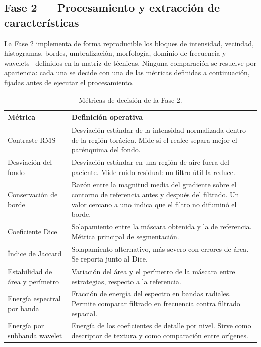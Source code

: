 \documentclass[12pt,a4paper]{article}
\begin{document}
\subsection{Fase 2 — Procesamiento y extracción de características}

La Fase 2 implementa de forma reproducible los bloques de intensidad, vecindad,
histogramas, bordes, umbralización, morfología, dominio de frecuencia y wavelets~\cite{dougherty2009}
definidos en la matriz de técnicas. Ninguna comparación se resuelve por apariencia:
cada una se decide con una de las métricas definidas a continuación, fijadas antes
de ejecutar el procesamiento.

\begin{table}[H]
\centering
\caption{Métricas de decisión de la Fase 2.}
\small
\begin{tabular}{@{}p{3.6cm}p{10.0cm}@{}}
\toprule
\textbf{Métrica} & \textbf{Definición operativa} \\
\midrule
Contraste RMS & Desviación estándar de la intensidad normalizada dentro de la región torácica. Mide si el realce separa mejor el parénquima del fondo. \\
\addlinespace
Desviación del fondo & Desviación estándar en una región de aire fuera del paciente. Mide ruido residual: un filtro útil la reduce. \\
\addlinespace
Conservación de borde & Razón entre la magnitud media del gradiente sobre el contorno de referencia antes y después del filtrado. Un valor cercano a uno indica que el filtro no difuminó el borde. \\
\addlinespace
Coeficiente Dice & Solapamiento entre la máscara obtenida y la de referencia. Métrica principal de segmentación. \\
\addlinespace
Índice de Jaccard & Solapamiento alternativo, más severo con errores de área. Se reporta junto al Dice. \\
\addlinespace
Estabilidad de área y perímetro & Variación del área y el perímetro de la máscara entre estrategias, respecto a la referencia. \\
\addlinespace
Energía espectral por banda & Fracción de energía del espectro en bandas radiales. Permite comparar filtrado en frecuencia contra filtrado espacial. \\
\addlinespace
Energía por subbanda wavelet & Energía de los coeficientes de detalle por nivel. Sirve como descriptor de textura y como comparación entre orígenes. \\
\bottomrule
\end{tabular}
\end{table}
\end{document}

